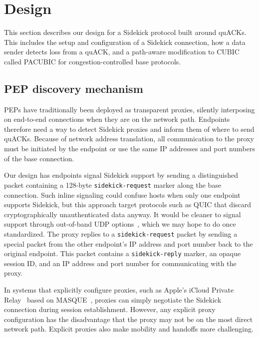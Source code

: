 \section{Design}
\label{sec:sidekick:design}

This section describes our design for a Sidekick protocol built around
quACKs. This includes the setup and configuration of a Sidekick
connection, how a data sender detects loss from a quACK, and a path-aware
modification to CUBIC called PACUBIC for congestion-controlled base
protocols.


\subsection{PEP discovery mechanism}
\label{sec:sidekick:design:discovery}

PEPs have traditionally been deployed as transparent proxies, silently
interposing on end-to-end connections when they are on the network path.
Endpoints therefore need a way to detect
Sidekick proxies and inform them of where to send quACKs.  Because
of network address translation, all communication to the proxy must be
initiated by the endpoint or use the same IP addresses and port numbers of the
base connection.

Our design has endpoints signal Sidekick support by sending a
distinguished packet containing a 128-byte \texttt{sidekick-request} marker
along the base connection.
Such inline signaling could confuse hosts when only one endpoint supports Sidekick,
but this approach target protocols
such as QUIC that discard cryptographically unauthenticated data anyway.  It
would be cleaner to signal support through out-of-band UDP options~\cite
{ietf-tsvwg-udp-options-28}, which we may hope to do once standardized.
The proxy replies to a \texttt{sidekick-request} packet by sending a special packet from
the other endpoint's IP address and port number back to the original endpoint.
This packet
contains a \texttt{sidekick-reply} marker, an opaque session ID, and an IP
address and port number for communicating with the proxy.

In systems that explicitly configure proxies, such as Apple's iCloud Private
Relay~\cite{icloud-private-relay} based on MASQUE~\cite
{kosek2021masque,kramer2021masquepep}, proxies can simply negotiate the Sidekick
connection during session establishment. However, any explicit proxy configuration
has the disadvantage that the proxy may not be on the most direct network path.
Explicit proxies also make mobility and handoffs more challenging.

